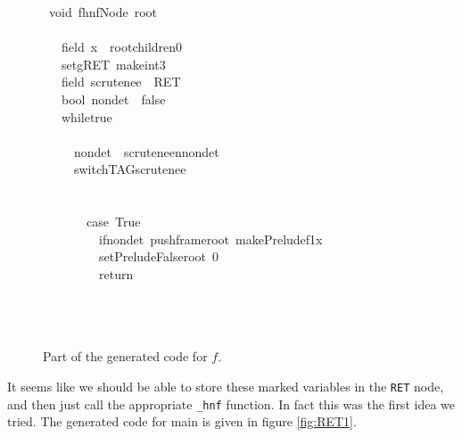 \documentclass{book}
\theoremstyle{definition}
\newcommand{\Varid}[1]{\mathit{#1}}
\begin{document}
\begin{figure}
\begin{tabbing}\ttfamily
~void~fhnfNode~root\\
\ttfamily ~\\
\ttfamily ~~~field~x~~rootchildren0\\
\ttfamily ~~~setgRET~makeint3\\
\ttfamily ~~~field~scrutenee~~RET\\
\ttfamily ~~~bool~nondet~~false\\
\ttfamily ~~~whiletrue\\
\ttfamily ~~~\\
\ttfamily ~~~~~nondet~~scruteneennondet\\
\ttfamily ~~~~~switchTAGscrutenee\\
\ttfamily ~~~~~\\
\ttfamily ~~~~~~~\\
\ttfamily ~~~~~~~case~True\\
\ttfamily ~~~~~~~~~ifnondet~pushframeroot~makePreludef1x\\
\ttfamily ~~~~~~~~~setPreludeFalseroot~0\\
\ttfamily ~~~~~~~~~return\\
\ttfamily ~~~~~\\
\ttfamily ~~~\\
\ttfamily ~
\end{tabbing}
\caption{Part of the generated code for \ensuremath{\Varid{f}}.}
\label{fig:gen_f}
\end{figure}

It seems like we should be able to 
store these marked variables in the \texttt{RET} node, and then 
just call the appropriate \texttt{\_hnf} function.
In fact this was the first idea we tried.
The generated code for main is given in figure \ref{fig:RET1}.
\end{document}
